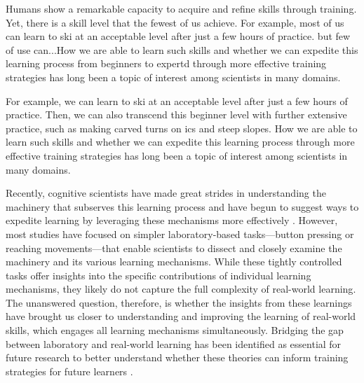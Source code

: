 Humans show a remarkable capacity to acquire and refine skills through training. Yet, there is a skill level that the fewest of us achieve. For example, most of us can learn to ski at an acceptable level after just a few hours of practice. but few of use can...How we are able to learn such skills and whether we can expedite this learning process from beginners to expertd through more effective training strategies has long been a topic of interest among scientists in many domains.  


For example, we can learn to ski at an acceptable level after just a few hours of practice. Then, we can also transcend this beginner level with further extensive practice, such as making carved turns on ics and steep slopes. How we are able to learn such skills and whether we can expedite this learning process through more effective training strategies has long been a topic of interest among scientists in many domains.  

Recently, cognitive scientists have made great strides in understanding the machinery that subserves this learning process and have begun to suggest ways to expedite learning by leveraging these mechanisms more effectively \cite{wolpert_principles_2011, makino_circuit_2016, spampinato_multiple_2021, krakauer_motor_2019, haith_model-based_2013}. However, most studies have focused on simpler laboratory-based tasks—button pressing or reaching movements—that enable scientists to dissect and closely examine the machinery and its various learning mechanisms. While these tightly controlled tasks offer insights into the specific contributions of individual learning mechanisms, they likely do not capture the full complexity of real-world learning\cite{krakauer_motor_2019, mangalam_investigating_2023, du_relationship_2022, chen_effects_2018, wolpert_principles_2011, gallivan_decision-making_2018}. The unanswered question, therefore, is whether the insights from these learnings have brought us closer to understanding and improving the learning of real-world skills, which engages all learning mechanisms simultaneously. Bridging the gap between laboratory and real-world learning has been identified as essential for future research to better understand whether these theories can inform training strategies for future learners  \cite{du_relationship_2022, wolpert_motor_2010, yarrow_inside_2009}. 

